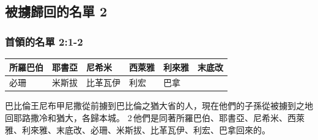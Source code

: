 \subsection{被擄歸回的名單 2}
\subsubsection{首領的名單 2:1-2}
\begin{table}[H]
\centering 
\begin{tabular}{|p{2cm}|p{2cm}|p{2cm}|p{2cm}|p{2cm}|p{2cm}|}
\hline
\hline
所羅巴伯&耶書亞&尼希米  &西萊雅&利來雅&末底改\\\hline
必珊    &米斯拔&比革瓦伊&利宏  &巴拿  & \\\hline
\end{tabular}
\end{table}
巴比倫王尼布甲尼撒從前擄到巴比倫之猶大省的人，現在他們的子孫從被擄到之地回耶路撒冷和猶大，各歸本城。 2 他們是同著所羅巴伯、耶書亞、尼希米、西萊雅、利來雅、末底改、必珊、米斯拔、比革瓦伊、利宏、巴拿回來的。

